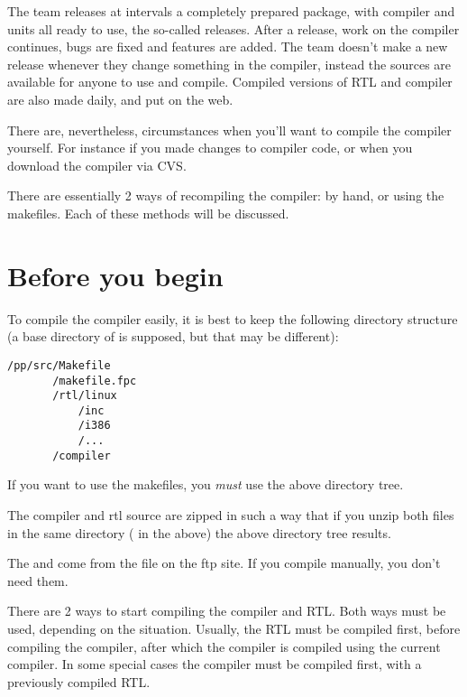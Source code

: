 \documentclass{report}
\begin{document}
The \fpc team releases at intervals a completely prepared package, with
compiler and units all ready to use, the so-called releases.  After a
release, work on the compiler continues, bugs are fixed and features are
added. The \fpc team doesn't make a new release whenever they change
something in the compiler, instead the sources are available for anyone to
use and compile. Compiled versions of RTL and compiler are also made daily,
and put on the web.

There are, nevertheless, circumstances when you'll want to compile the
compiler yourself. For instance if you made changes to compiler code,
or when you download the compiler via CVS.

There are essentially 2 ways of recompiling the compiler: by hand, or using
the makefiles. Each of these methods will be discussed.

\section{Before you begin}

To compile the compiler easily, it is best to keep the following directory
structure (a base directory of  is supposed, but that may be
different):
\begin{verbatim}
/pp/src/Makefile
       /makefile.fpc
       /rtl/linux
           /inc
           /i386
           /...
       /compiler
\end{verbatim}
If you want to use the makefiles, you {\em must} use the above directory
tree.

The compiler and rtl source are zipped in such a way that if you unzip both
files in the same directory ( in the above) the above
directory tree results.

The  and  come from the 
file on the ftp site. If you compile manually, you don't need them.

There are 2 ways to start compiling the compiler and RTL. Both ways must be
used, depending on the situation. Usually, the RTL must be compiled first,
before compiling the compiler, after which the compiler is compiled using
the current compiler. In some special cases the compiler must be compiled
first, with a previously compiled RTL.
\end{document}
